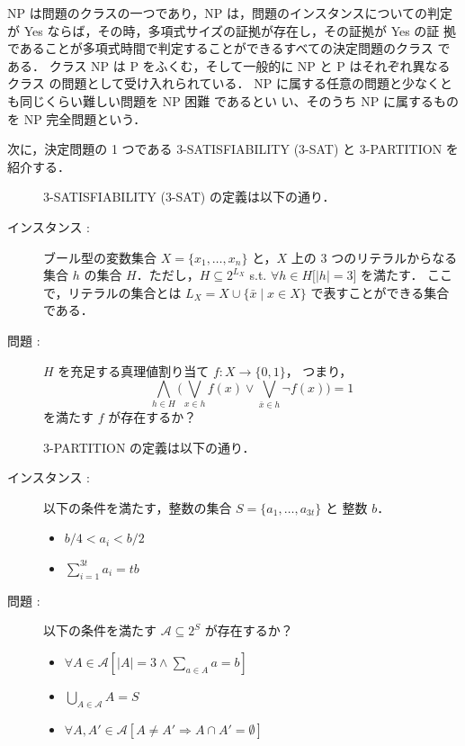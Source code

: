 \documentclass[12pt]{optlab-bachelor}
\begin{document}
NP は問題のクラスの一つであり，NP は，問題のインスタンスについての判定
が Yes ならば，その時，多項式サイズの証拠が存在し，その証拠が Yes の証
拠であることが多項式時間で判定することができるすべての決定問題のクラス
である．
クラス NP は P をふくむ，そして一般的に NP と P はそれぞれ異なるクラス
の問題として受け入れられている．
NP に属する任意の問題と少なくとも同じくらい難しい問題を NP 困難 であるとい
い、そのうち NP に属するものを NP 完全問題という．

次に，決定問題の 1 つである \textsc{\textsc{3-SATISFIABILITY}} (\textsc{3-SAT}) と \textsc{3-PARTITION} を紹介する．

\begin{description}
  \item[] \textsc{\textsc{3-SATISFIABILITY}} (\textsc{3-SAT}) の定義は以下の通り．
  \item[インスタンス : ] ブール型の変数集合 $X = \{x_1,\ldots,x_n\}$ と，$X$ 上の 3 つのリテラルからなる集合 $h$ の集合 $H$．ただし，$H \subseteq 2^{L_X}$ s.t. $\forall h \in H \big[|h| = 3\big]$ を満たす．
  ここで，リテラルの集合とは $L_X = X \cup \{\bar x \mid x \in X\}$ で表すことができる集合である．
  \item[問題 : ] $H$ を充足する真理値割り当て $f : X \to \{0,1\}$，
  つまり，
  $$\displaystyle \bigwedge_{h \in H} \bigg(\bigvee_{x \in h}f(x) \lor
  \bigvee_{\bar x \in h}\lnot f(x) \bigg) = 1$$
  を満たす $f$ が存在するか？
\end{description}

\begin{description}
  \item[] \textsc{3-PARTITION} の定義は以下の通り．
  \item[インスタンス : ] 以下の条件を満たす，整数の集合 $S = \{a_1,\ldots,a_{3t}\}$ と 整数 $b$．
  \begin{itemize}
    \item $b/4 < a_i < b/2$
    \item $\displaystyle \sum_{i = 1}^{3t}a_i = tb$
  \end{itemize}
  \item[問題 : ] 以下の条件を満たす $\mathcal{A} \subseteq 2^S$ が存在するか？
  \begin{itemize}
    \item $\forall A \in \mathcal{A}[|A| = 3 \land \sum_{a \in A} a = b]$
    \item $\bigcup_{A \in \mathcal{A}} A = S$
    \item $\forall A, A' \in \mathcal{A}[A \neq A' \Rightarrow A \cap A' = \emptyset]$
  \end{itemize}
\end{description}
\end{document}
